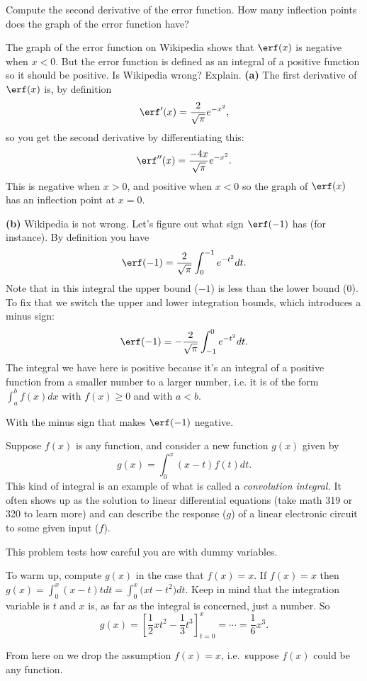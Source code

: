 \begin{multicols}{2}
\subprob Compute the second derivative of the error function.  How
many inflection points does the graph of the error function have?

\subprob The graph of the error function on Wikipedia shows that
$\erf(x)$ is negative when $x<0$.  But the error function is defined as
an integral of a positive function so it should be positive.  Is
Wikipedia wrong? Explain.
\answer
\textbf{(a)} The first derivative of $\erf(x)$ is, by definition
\[
\erf'(x) = \frac2{\sqrt{\pi}}e^{-x^2},
\]
so you get the second derivative by differentiating this:
\[
\erf''(x) = \frac{-4x}{\sqrt{\pi}} e^{-x^2}.
\]
This is negative when $x>0$, and positive when $x<0$ so the graph of
$\erf(x)$ has an inflection point at $x=0$.

\textbf{(b)} Wikipedia is not wrong. Let's figure out what sign
$\erf(-1)$ has (for instance).  By definition you have
\[
\erf(-1) =\frac{2}{\sqrt{\pi}} \int_0^{-1}e^{-t^2}dt.
\]
Note that in this integral the upper bound ($-1$) is less than the
lower bound ($0$).  To fix that we switch the upper and lower
integration bounds, which introduces a minus sign:
\[
\erf(-1) = -\frac{2}{\sqrt{\pi}}\int_{-1}^0 e^{-t^2} dt.
\]
The integral we have here is positive because it's an integral of a
positive function from a smaller number to a larger number, i.e. it
is of the form $\int_a^b f(x) dx$ with $f(x)\ge0$ and with $a<b$.

With the minus sign that makes $\erf(-1)$ negative.
\endanswer

\problem Suppose $f(x)$ is any function, and consider a new function $g(x)$
given by
\[
  g(x) = \int_0^x (x-t) f(t) dt.
\]
This kind of integral is an example of what is called a \textit{convolution
integral.}  It often shows up as the solution to linear differential equations
(take math 319 or 320 to learn more) and can describe the response ($g$) of a linear
electronic circuit to some given input ($f$).  

This problem tests how careful you are with dummy variables.

\subprob To warm up, compute $g(x)$ in the case that $f(x) = x$.
\answer
If $f(x) = x$ then $g(x) = \int_0^x (x-t)tdt = \int_0^x \bigl(xt - t^2\bigr)
dt$.  Keep in mind that the integration variable is $t$ and $x$ is, as far as
the integral is concerned, just a number.  So
\[
  g(x) = \left[ \frac12xt^2 - \frac13 t^3 \right]_{t=0}^x = \cdots = \frac16x^3.
\]
\endanswer

From here on we drop the assumption $f(x) = x$, i.e.~suppose $f(x)$ could
be any function.  


\end{multicols}
